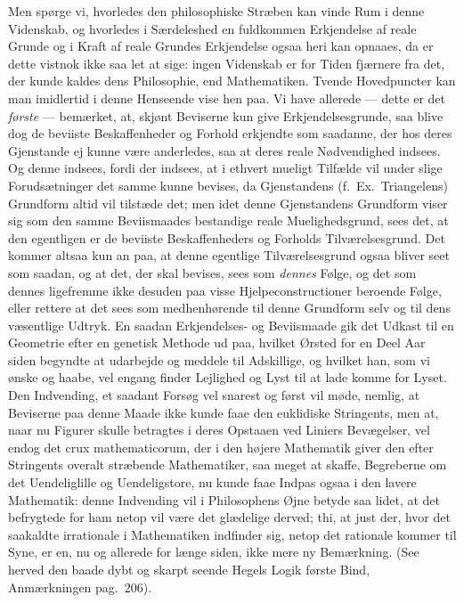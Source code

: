 \documentclass[12pt,a4paper]{book}
\newcommand{\apage}[1]{\marginnote{\footnotesize\textit{[#1]}}}
\begin{document}
Men spørge vi, hvorledes den philosophiske Stræben kan vinde Rum i denne
Videnskab, og hvorledes i Særdeleshed en fuldkommen Erkjendelse af reale Grunde
og i Kraft af reale \apage{81} Grundes Erkjendelse ogsaa heri kan opnaaes, da er dette
vistnok ikke saa let at sige: ingen Videnskab er for Tiden fjærnere fra det, der
kunde kaldes dens Philosophie, end Mathematiken. Tvende Hovedpuncter kan man
imidlertid i denne Henseende vise hen paa. Vi have allerede --- dette er det
\emph{første} --- bemærket, at, skjønt Beviserne kun give Erkjendelsesgrunde, saa
blive dog de beviiste Beskaffenheder og Forhold erkjendte som saadanne, der hos
deres Gjenstande ej kunne være anderledes, saa at deres reale Nødvendighed
indsees. Og denne indsees, fordi der indsees, at i ethvert mueligt Tilfælde vil
under slige Forudsætninger det samme kunne bevises, da Gjenstandens (f.~Ex.\
Triangelens) Grundform altid vil tilstæde det; men idet denne Gjenstandens
Grundform viser sig som den samme Beviismaades bestandige reale Muelighedsgrund,
sees det, at den egentligen er de beviiste Beskaffenheders og Forholds
Tilværelsesgrund. Det kommer altsaa kun an paa, at denne egentlige
Tilværelsesgrund ogsaa bliver seet som saadan, og at det, der skal bevises, sees
som \emph{dennes} Følge, og det som dennes ligefremme ikke desuden paa visse
Hjelpeconstructioner beroende Følge, eller rettere at det sees som medhenhørende
til denne Grundform selv og til dens væsentlige Udtryk. En saadan Erkjendelses- og
Beviismaade gik det Udkast til en Geometrie efter \apage{82}  en genetisk Methode ud paa,
hvilket Ørsted for en Deel Aar siden begyndte at udarbejde og meddele til
Adskillige, og hvilket han, som vi ønske og haabe, vel engang finder Lejlighed og
Lyst til at lade komme for Lyset. Den Indvending, et saadant Forsøg vel snarest og
først vil møde, nemlig, at Beviserne paa denne Maade ikke kunde faae den
euklidiske Stringents, men at, naar nu Figurer skulle betragtes i deres Opstaaen
ved Liniers Bevægelser, vel endog det crux mathematicorum, der i den højere
Mathematik giver den efter Stringents overalt stræbende Mathematiker, saa meget at
skaffe, Begreberne om det Uendeliglille og Uendeligstore, nu kunde faae Indpas
ogsaa i den lavere Mathematik: denne Indvending vil i Philosophens Øjne betyde saa
lidet, at det befrygtede for ham netop vil være det glædelige derved; thi, at just
der, hvor det saakaldte irrationale i Mathematiken indfinder sig, netop det
rationale kommer til Syne, er en, nu og allerede for længe siden, ikke mere ny
Bemærkning. (See herved den baade dybt og skarpt seende Hegels Logik første Bind,
Anmærkningen pag.\ 206).
\end{document}
